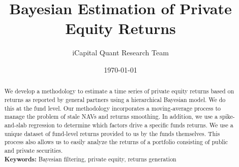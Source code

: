 \documentclass[11pt]{article}
\begin{document}
\title{Bayesian Estimation of Private Equity Returns}
\author{iCapital Quant Research Team}
\date{\today}


\maketitle

\newpage

\begin{abstract}
\noindent We develop a methodology to estimate a time series of private equity returns based on returns as reported by general partners using a hierarchical Bayesian model.  We do this at the fund level. Our methodology incorporates a moving-average process to manage the problem of stale NAVs and returns smoothing. In addition, we use a spike-and-slab regression to determine which factors drive a specific funds returns. We use a unique dataset of fund-level returns provided to us by the funds themselves. This process also allows us to easily analyze the returns of a portfolio consisting of public and private securities. \\

\noindent\textbf{Keywords:} Bayesian filtering, private equity, returns generation\\

\vspace{0in}

\end{abstract}

\newpage

%

\end{document}
